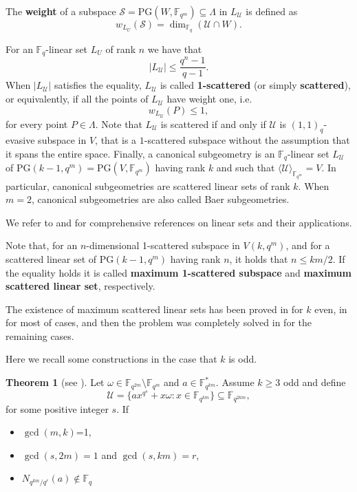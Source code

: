 \documentclass[11pt]{amsart}
\theoremstyle{definition}
\newtheorem{theorem}{Theorem}[section]
\newcommand{\F}{{\mathbb F}}
\newcommand{\U}{{\mathcal{U}}}
\newcommand{\fq}{{\mathbb F}_{q}}
\newcommand{\PG}{\mathrm{PG}}
\begin{document}
{The \textbf{weight} of a subspace $\mathcal{S}=\PG(W,\F_{q^m})\subseteq \Lambda$ in $L_{\U}$ is defined as 
\[ w_{L_U}(\mathcal{S})=\dim_{\fq}(\U\cap W). \]

For an $\F_q$-linear set $L_U$ of rank $n$ we have that
\[
    |L_{\U}| \leq \frac{q^n-1}{q-1}.
\]
When $|L_{\U}|$ satisfies the equality, $L_{\U}$ is called \textbf{1-scattered} (or simply \textbf{scattered}), or equivalently, if all the points of $L_{\U}$ have weight one, i.e. 
\[
w_{L_{\U}}(P) \leq 1,
\]
for every point $P \in \Lambda$.
Note that $L_{\U}$ is scattered if and only if $\U$ is $(1,1)_q$-evasive subspace in $V$, that is a $1$-scattered subspace without the assumption that it spans the entire space.
Finally, a canonical subgeometry is an $\fq$-linear set $L_{\U}$ of $\PG(k-1,q^m)=\PG(V,\F_{q^m})$ having rank $k$ and such that $\langle \U \rangle_{\F_{q^m}}=V$.
In particular, canonical subgeometries are scattered linear sets of rank $k$.
When $m=2$, canonical subgeometries are also called Baer subgeometries.

We refer to \cite{lavrauw2015field} and \cite{polverino2010linear} for comprehensive references on linear sets and their applications.

\medskip

Note that, for an $n$-dimensional 1-scattered subspace in $V(k,q^m)$, and for a scattered linear set of $\PG(k-1,q^m)$ having rank $n$, it holds that $n \leq km/2$. If the equality holds it is called \textbf{maximum 1-scattered subspace} and \textbf{maximum scattered linear set}, respectively.


The existence of maximum scattered linear sets has been proved in \cite{blokhuis2000scattered} for $k$ even, in \cite{bartoli2018maximum} for most of cases, and then the problem was completely solved in \cite{csajbok2017maximum} for the remaining cases.

Here we recall some constructions in the case that $k$ is odd.


\begin{theorem} [see \textnormal{\cite[Theorem 2.2]{bartoli2018maximum}}] \label{th:masxcattkodd1}
Let $\omega \in \F_{q^{2m}} \setminus \F_{q^{m}}$ and $a \in \F_{q^{km}}^*$. Assume $k \geq 3$ odd and define
\[
\U=\{ ax^{q^s}+x\omega \colon x \in  \F_{q^{km}}\} \subseteq \F_{q^{2km}},
\]
for some positive integer $s$.
If 
   \begin{itemize}
       \item $\gcd(m,k)$=1,
       \item $\gcd(s,2m)=1$ and $\gcd(s,km)=r$,
       \item $N_{q^{km}/q^r}(a) \notin \F_q$
   \end{itemize} 



\end{theorem}}
\end{document}
